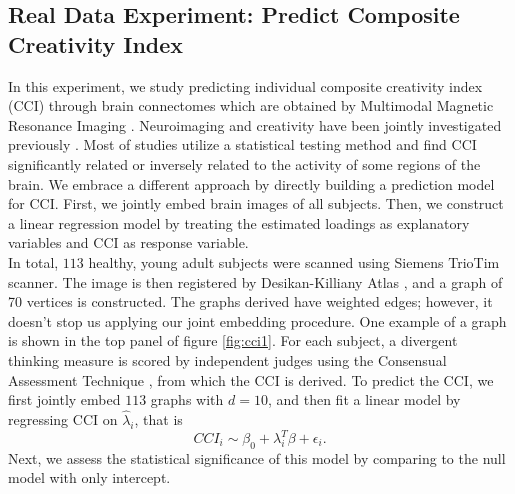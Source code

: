 \documentclass[10pt,journal,compsoc]{IEEEtran}
\begin{document}
\subsection{Real Data Experiment: Predict Composite Creativity Index}
In this experiment, we study predicting individual composite creativity index (CCI) through brain connectomes which are obtained by Multimodal Magnetic Resonance Imaging \cite{koutra2013d}. Neuroimaging and creativity have been jointly investigated previously \cite{arden2010neuroimaging}. Most of studies utilize a statistical testing method and find CCI significantly related or inversely related to the activity of some regions of the brain. We embrace a different approach by directly building a prediction model for CCI. First, we jointly embed brain images of all subjects. Then, we construct a linear regression model by treating the estimated loadings as explanatory variables and CCI as response variable. \\

\noindent In total, $113$ healthy, young adult subjects were scanned using Siemens TrioTim scanner. The image is then registered by Desikan-Killiany Atlas \cite{desikan2006automated}, and a graph of 70 vertices is constructed. The graphs derived have weighted edges; however, it doesn't stop us applying our joint embedding procedure. One example of a graph is shown in the top panel of figure \ref{fig:cci1}. For each subject, a divergent thinking measure is scored by independent judges using the Consensual Assessment Technique \cite{amabile1983social}, from which the CCI is derived. To predict the CCI, we first jointly embed $113$ graphs with $d=10$, and then fit a linear model by regressing CCI on $\hat{\lambda}_i$, that is
\[CCI_i \sim \beta_0+\lambda_i^T\beta + \epsilon_i. \]
Next, we assess the statistical significance of this model by comparing to the null model with only intercept. \\
\end{document}
